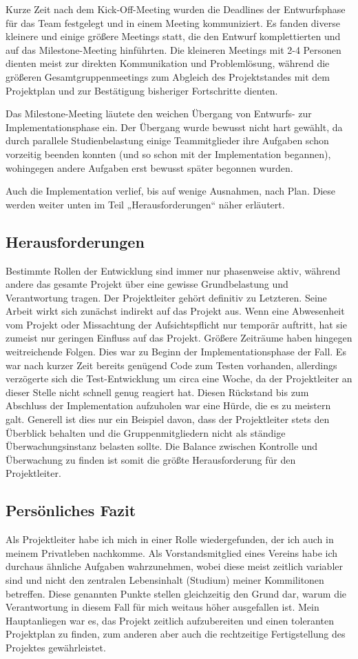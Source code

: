 \documentclass{scrartcl}
\begin{document}
Kurze Zeit nach dem Kick-Off-Meeting wurden die Deadlines der Entwurfsphase für das Team festgelegt und in einem Meeting kommuniziert. Es fanden diverse kleinere und einige größere Meetings statt, die den Entwurf komplettierten und auf das Milestone-Meeting hinführten. Die kleineren Meetings mit 2-4 Personen dienten meist zur direkten Kommunikation und Problemlösung, während die größeren Gesamtgruppenmeetings zum Abgleich des Projektstandes mit dem Projektplan und zur Bestätigung bisheriger Fortschritte dienten. 

Das Milestone-Meeting läutete den weichen Übergang von Entwurfs- zur Implementationsphase ein. Der Übergang wurde bewusst nicht hart gewählt, da durch parallele Studienbelastung einige Teammitglieder ihre Aufgaben schon vorzeitig beenden konnten (und so schon mit der Implementation begannen), wohingegen andere Aufgaben erst bewusst später begonnen wurden. 

Auch die Implementation verlief, bis auf wenige Ausnahmen, nach Plan. Diese werden weiter unten im Teil „Herausforderungen“ näher erläutert.

\subsection{Herausforderungen}
Bestimmte Rollen der Entwicklung sind immer nur phasenweise aktiv, während andere das gesamte Projekt über eine gewisse Grundbelastung und Verantwortung tragen. Der Projektleiter gehört definitiv zu Letzteren. Seine Arbeit wirkt sich zunächst indirekt auf das Projekt aus. Wenn eine Abwesenheit vom Projekt oder Missachtung der Aufsichtspflicht nur temporär auftritt, hat sie zumeist nur geringen Einfluss auf das Projekt. Größere Zeiträume haben hingegen weitreichende Folgen. Dies war zu Beginn der Implementationsphase der Fall. Es war nach kurzer Zeit bereits genügend Code zum Testen vorhanden, allerdings verzögerte sich die Test-Entwicklung um circa eine Woche, da der Projektleiter an dieser Stelle nicht schnell genug reagiert hat. Diesen Rückstand bis zum Abschluss der Implementation aufzuholen war eine Hürde, die es zu meistern galt. Generell ist dies nur ein Beispiel davon, dass der Projektleiter stets den Überblick behalten und die Gruppenmitgliedern nicht als ständige Überwachungsinstanz belasten sollte. Die Balance zwischen Kontrolle und Überwachung zu finden ist somit die größte Herausforderung für den Projektleiter.

\subsection{Persönliches Fazit}
Als Projektleiter habe ich mich in einer Rolle wiedergefunden, der ich auch in meinem Privatleben nachkomme. Als Vorstandsmitglied eines Vereins habe ich durchaus ähnliche Aufgaben wahrzunehmen, wobei diese meist zeitlich variabler sind und nicht den zentralen Lebensinhalt (Studium) meiner Kommilitonen betreffen. Diese genannten Punkte stellen gleichzeitig den Grund dar, warum die Verantwortung in diesem Fall für mich weitaus höher ausgefallen ist. Mein Hauptanliegen war es, das Projekt zeitlich aufzubereiten und einen toleranten Projektplan zu finden, zum anderen aber auch die rechtzeitige Fertigstellung des Projektes gewährleistet.

\end{document}
